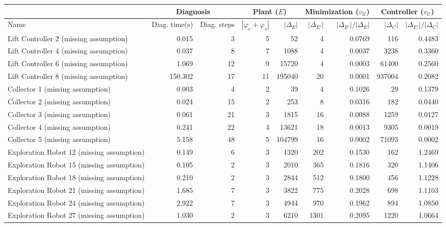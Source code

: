 \begin{tabular}{|l|rr|rr|rr|rr|}
  \hline & \multicolumn{2}{c|}{Diagnosis}&\multicolumn{2}{c|}{Plant ($E$)} & \multicolumn{2}{c|}{Minimization ($v_{\mathcal{U}}$)} & \multicolumn{2}{c|}{Controller ($v_{\mathcal{C}}$)}\\ \hline
Name & Diag. time(s) & Diag. steps & $|\varphi_e + \varphi_s|$ & $|\Delta_E|$ & $|\Delta_{E'}|$ & $|\Delta_{E'}|/|\Delta_{E}|$ & $|\Delta_{C}|$ & $|\Delta_{E'}|/|\Delta_{C}|$ \\ 
  \hline
Lift Controller 2 (missing assumption) & 0.015 & 3 & 5 & 52 & 4 & 0.0769 & 116 & 0.4483 \\ 
  Lift Controller 4 (missing assumption) & 0.037 & 8 & 7 & 1088 & 4 & 0.0037 & 3238 & 0.3360 \\ 
  Lift Controller 6 (missing assumption) & 1.069 & 12 & 9 & 15720 & 4 & 0.0003 & 61400 & 0.2560 \\ 
  Lift Controller 8 (missing assumption) & 150.302 & 17 & 11 & 195040 & 20 & 0.0001 & 937004 & 0.2082 \\ 
  Collector 1 (missing assumption) & 0.003 & 4 & 2 & 39 & 4 & 0.1026 & 29 & 0.1379 \\ 
  Collector 2 (missing assumption) & 0.024 & 15 & 2 & 253 & 8 & 0.0316 & 182 & 0.0440 \\ 
  Collector 3 (missing assumption) & 0.061 & 21 & 3 & 1815 & 16 & 0.0088 & 1259 & 0.0127 \\ 
  Collector 4 (missing assumption) & 0.241 & 22 & 4 & 13621 & 18 & 0.0013 & 9305 & 0.0019 \\ 
  Collector 5 (missing assumption) & 5.158 & 48 & 5 & 104799 & 16 & 0.0002 & 71093 & 0.0002 \\ 
  Exploration Robot 12 (missing assumption) & 0.149 & 6 & 3 & 1320 & 202 & 0.1530 & 162 & 1.2469 \\ 
  Exploration Robot 15 (missing assumption) & 0.105 & 2 & 3 & 2010 & 365 & 0.1816 & 320 & 1.1406 \\ 
  Exploration Robot 18 (missing assumption) & 0.210 & 2 & 3 & 2844 & 512 & 0.1800 & 456 & 1.1228 \\ 
  Exploration Robot 21 (missing assumption) & 1.685 & 7 & 3 & 3822 & 775 & 0.2028 & 698 & 1.1103 \\ 
  Exploration Robot 24 (missing assumption) & 2.922 & 7 & 3 & 4944 & 970 & 0.1962 & 894 & 1.0850 \\ 
  Exploration Robot 27 (missing assumption) & 1.030 & 2 & 3 & 6210 & 1301 & 0.2095 & 1220 & 1.0664 \\ 

\end{tabular}
